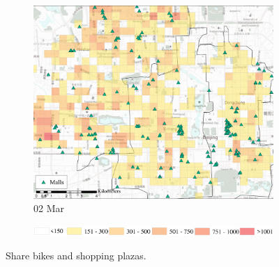 \documentclass[preprints,ijgi,submit,moreauthors]{Definitions/mdpi}
\begin{document}
\begin{figure}[H]
\begin{subfigure}{.32\textwidth}
        \includegraphics[width=\textwidth]{Figures/Relation_with_POIs/POIsMallD2020_03_02.pdf}
        \caption{02 Mar}
    \end{subfigure}

    \vspace{6pt}
    \begin{subfigure}{.7\textwidth}
        \includegraphics[width=\textwidth]{Figures/AppendixLegend2.eps}
    \end{subfigure}
    \caption{Share bikes and shopping plazas.}
    \label{fig:BSS_malls}
\end{figure}
\end{document}
